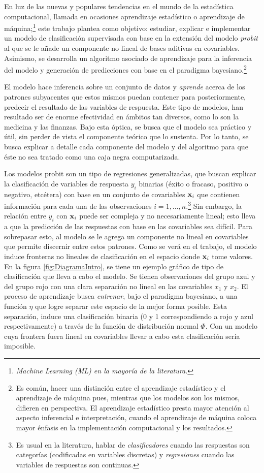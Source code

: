 \documentclass[../Main/Main.tex]{subfiles}
\begin{document}
En luz de las nuevas y populares tendencias en el mundo de la estadística computacional, llamada en ocasiones aprendizaje estadístico o aprendizaje de máquina;\footnote{\textit{Machine Learning (ML) en la mayoría de la literatura.}} este trabajo plantea como objetivo: estudiar, explicar e implementar un modelo de clasificación supervisada con base en la extensión del modelo \textit{probit} al que se le añade un componente no lineal de bases aditivas en covariables. Asimismo, se desarrolla un algoritmo asociado de aprendizaje para la inferencia del modelo y generación de predicciones con base en el paradigma bayesiano.\footnote{Es común, hacer una distinción entre el aprendizaje estadístico y el aprendizaje de máquina pues, mientras que los modelos son los mismos, difieren en perspectiva. El aprendizaje estadístico presta mayor atención al aspecto inferencial e interpretación, cuando el aprendizaje de máquina coloca mayor énfasis en la implementación computacional y los resultados.}

El modelo hace inferencia sobre un conjunto de datos y \textit{aprende} acerca de los patrones subyacentes que estos mismos puedan contener para posteriormente, predecir el resultado de las variables de respuesta. Este tipo de modelos, han resultado ser de enorme efectividad en ámbitos tan diversos, como lo son la medicina y las finanzas. Bajo esta óptica, se busca que el modelo sea práctico y útil, sin perder de vista el componente teórico que lo sustenta. Por lo tanto, se busca explicar a detalle cada componente del modelo y del algoritmo para que éste no sea tratado como una caja negra computarizada.

Los modelos probit son un tipo de regresiones generalizadas, que buscan explicar la clasificación de variables de respuesta $y_i$ binarias (éxito o fracaso, positivo o negativo, etcétera) con base en un conjunto de covariables $\mathbf{x}_i$ que contienen información para cada una de las observaciones $i = 1,\ldots,n$.\footnote{Es usual en la literatura, hablar de \textit{clasificadores} cuando las respuestas son categorías (codificadas en variables discretas) y \textit{regresiones} cuando las variables de respuestas son continuas.} Sin embargo, la relación entre $y_i$ con $\mathbf{x}_i$ puede ser compleja y no necesariamente lineal; esto lleva a que la predicción de las respuestas con base en las covariables sea difícil. Para sobrepasar esto, al modelo se le agrega un componente no lineal en covariables que permite discernir entre estos patrones. Como se verá en el trabajo, el modelo induce fronteras no lineales de clasificación en el espacio donde $\mathbf{x}_i$ tome valores. En la figura \ref{fig:DiagramaIntro}, se tiene un ejemplo gráfico de tipo de clasificación que lleva a cabo el modelo. Se tienen observaciones del grupo azul y del grupo rojo con una clara separación no lineal en las covariables $x_1$ y $x_2$. El proceso de aprendizaje busca \textit{entrenar}, bajo el paradigma bayesiano, a una función $\eta$ que logre separar este espacio de la mejor forma posible. Esta separación, induce una clasificación binaria (0 y 1 correspondiendo a rojo y azul respectivamente) a través de la función de distribución normal $\Phi$. Con un modelo cuya frontera fuera lineal en covariables llevar a cabo esta clasificación sería imposible. 
\end{document}
